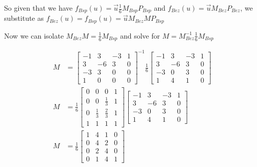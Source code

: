 \documentclass{letter}
\begin{document}
So given that we have $f_{Bsp}(u) = \vec{u}\frac{1}{6}M_{Bsp}P_{Bsp}$ and $f_{Bez}(u) = \vec{u}M_{Bez}P_{Bez}$, we substitute as $f_{Bez}(u) = f_{Bsp}(u) = \vec{u}M_{Bez}MP_{Bsp}$

Now we can isolate $M_{Bez}M = \frac{1}{6}M_{Bsp}$ and solve for $M = M_{Bez}^{-1}\frac{1}{6}M_{Bsp}$

\begin{align*}
M &= 
\begin{bmatrix}
-1 & 3 & -3 & 1 \\
3 & -6 & 3 & 0 \\
-3 & 3 & 0 & 0 \\
1 & 0 & 0 & 0 
\end{bmatrix}^{-1}
\frac{1}{6}
\begin{bmatrix}
-1 & 3 & -3 & 1 \\
3 & -6 & 3 & 0 \\
-3 & 0 & 3 & 0 \\
1 & 4 & 1 & 0 
\end{bmatrix}
\\
M &= 
\frac{1}{6}
\begin{bmatrix}
0 & 0 & 0 & 1 \\
0 & 0 & \frac{1}{3} & 1 \\
0 & \frac{1}{3} & \frac{2}{3} & 1 \\
1 & 1 & 1 & 1
\end{bmatrix}
\begin{bmatrix}
-1 & 3 & -3 & 1 \\
3 & -6 & 3 & 0 \\
-3 & 0 & 3 & 0 \\
1 & 4 & 1 & 0 
\end{bmatrix}
\\
M &= 
\frac{1}{6}
\begin{bmatrix}
1 & 4 & 1 & 0 \\
0 & 4 & 2 & 0 \\
0 & 2 & 4 & 0 \\
0 & 1 & 4 & 1
\end{bmatrix}
\end{align*}
\end{document}
